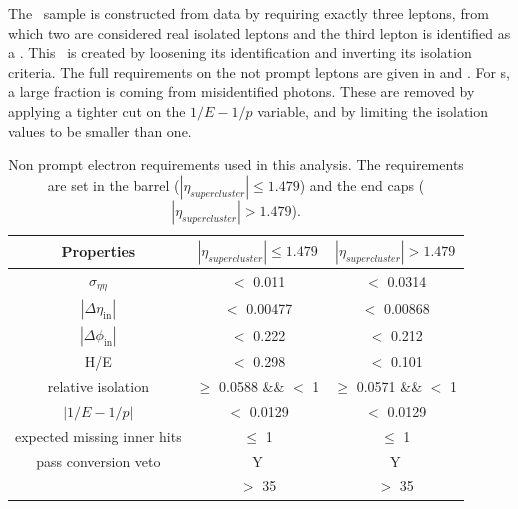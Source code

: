 The \NPL\ sample is constructed from data by requiring exactly three leptons, from which two are considered real isolated leptons and the third lepton is identified as a \NPL. This \NPL\ is created by loosening its identification and inverting its isolation criteria. The full requirements on the not prompt leptons are given in   and . For \NPE s, a large fraction is coming from misidentified photons. These are removed by applying a tighter cut on the $1/E-1/p$ variable, and by limiting the isolation values to be smaller than one. 
\begin{table}[htbp]
	\centering
	
	\caption{Non prompt electron requirements used in this analysis. The requirements are set in the barrel ($|\eta_{supercluster}| \leq 1.479$)
		and the end caps ($|\eta_{supercluster}| > 1.479$). }
	\begin{tabular}{ccc}
		\toprule
	 Properties	& \multicolumn{1}{c|}{$|\eta_{supercluster}| \leq 1.479$ } & \multicolumn{1}{c}{$|\eta_{supercluster}| > 1.479$ } \\
		\midrule
		$\sigma_{\eta \eta}$ & $<$ 0.011 & $<$ 0.0314 \\ 
		
		$|\Delta\eta_{\mathrm{in}}|$ & $<$ 0.00477& $<$ 0.00868\\ 
		
		$|\Delta\phi_{\mathrm{in}}|$ & $<$ 0.222 &  $<$ 0.212 \\ 
		 
		H/E & $<$ 0.298& $<$ 0.101 \\ 
		
		relative isolation & $\geq$ 0.0588 \&\& $<$ 1 &  $\geq$ 0.0571 \&\& $<$ 1\\ 
	
		$|1/E-1/p|$ & $<$ 0.0129 \GeVinv & $<$ 0.0129 \GeVinv \\ 
		
		expected missing inner hits & $\leq $ 1 &  $\leq $ 1\\ 
	
		pass conversion veto & Y & Y \\ 
	
		\pt &$>$ 35 \GeV & $>$ 35 \GeV \\
		\bottomrule
	\end{tabular} 
	\label{tab:nonpromptel}
\end{table}

